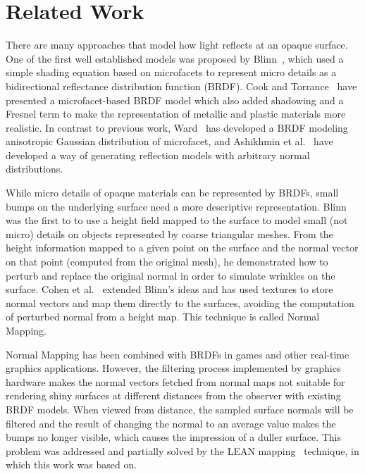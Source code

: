 \documentclass[10pt, conference]{IEEEtran}
\begin{document}
\section{Related Work}
\label{sec:related_work}
%
There are many approaches that model how light reflects at an opaque surface. One of the first well established models was proposed by Blinn~\cite{Blinn:1977:MLR:563858.563893}, which used a simple shading equation based on microfacets to represent micro details as a bidirectional reflectance distribution function (BRDF). Cook and Torrance~\cite{Cook:1982:RMC:357290.357293} have presented a microfacet-based BRDF model which also added shadowing and a Fresnel term to make the representation of metallic and plastic materials more realistic. In contrast to previous work, Ward~\cite{Ward:1992:MMA:133994.134078} has developed a BRDF modeling anisotropic Gaussian distribution of microfacet, and Ashikhmin et al.~\cite{Ashikmin:2000:MBG:344779.344814}  have developed a way of generating reflection models with arbitrary normal distributions.

While micro details of opaque materials can be represented by BRDFs, small bumps on the underlying surface need a more descriptive representation. Blinn~\cite{Blinn:1978:SWS:800248.507101} was the first to to use a height field mapped to the surface to model small (not micro) details on objects represented by coarse triangular meshes. From the height information mapped to a given point on the surface and the normal vector on that point (computed from the original mesh), he demonstrated how to perturb and replace the original normal in order to simulate wrinkles on the surface. Cohen et al.~\cite{Cohen:1998:AS:280814.280832} extended Blinn's ideas and has used textures to store normal vectors and map them directly to the surfaces, avoiding the computation of perturbed normal from a height map. This technique is called Normal Mapping.

Normal Mapping has been combined with BRDFs in games and other real-time graphics applications. However, the filtering process implemented by graphics hardware makes the normal vectors fetched from normal maps not suitable for rendering shiny surfaces at different distances from the observer with existing BRDF models. When viewed from distance, the sampled surface normals will be filtered and the result of changing the normal to an average value makes the bumps no longer visible, which causes the impression of a duller surface. This problem was addressed and partially solved by the LEAN mapping~\cite{Olano:2010:LM:1730804.1730834} technique, in which this work was based on.
\end{document}
